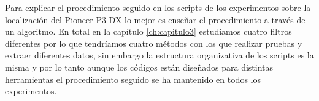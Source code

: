 Para explicar el procedimiento seguido en los scripts de los experimentos sobre la localización del Pioneer P3-DX  lo mejor es enseñar el procedimiento a través de un algoritmo.
%
%
%
En total en la capítulo \ref{ch:capitulo3} estudiamos cuatro filtros diferentes por lo que tendríamos cuatro métodos con los que realizar pruebas y extraer diferentes datos, sin embargo la estructura organizativa de los scripts es la misma y por lo tanto aunque los códigos están diseñados para distintas herramientas el procedimiento seguido se ha mantenido en todos los experimentos.
%
%
%

